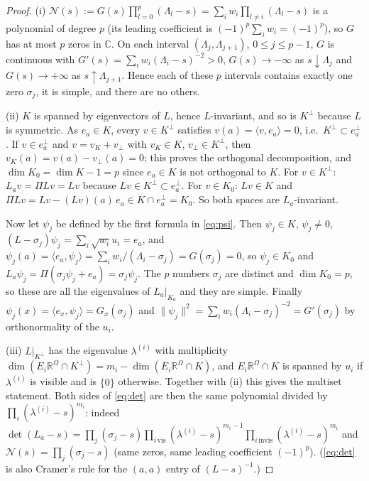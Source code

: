 \documentclass[11pt,a4paper]{article}
\newcommand{\R}{\mathbb R}
\newcommand{\ip}[2]{\langle #1,#2\rangle}
\theoremstyle{plain}
\theoremstyle{definition}
\numberwithin{equation}{section}
\begin{document}
\begin{proof}
(i) $\mathcal N(s):=G(s)\prod_{l=0}^p(\Lambda_l-s)=\sum_{i}w_i\prod_{l\ne i}(\Lambda_l-s)$ is a polynomial of degree $p$ (its leading coefficient is $(-1)^p\sum_iw_i=(-1)^p$), so $G$ has at most $p$ zeros in $\mathbb C$. On each interval $(\Lambda_j,\Lambda_{j+1})$, $0\le j\le p-1$, $G$ is continuous with $G'(s)=\sum_iw_i(\Lambda_i-s)^{-2}>0$, $G(s)\to-\infty$ as $s\downarrow\Lambda_j$ and $G(s)\to+\infty$ as $s\uparrow\Lambda_{j+1}$. Hence each of these $p$ intervals contains exactly one zero $\sigma_j$, it is simple, and there are no others.

(ii) $K$ is spanned by eigenvectors of $L$, hence $L$-invariant, and so is $K^\perp$ because $L$ is symmetric. As $e_a\in K$, every $v\in K^\perp$ satisfies $v(a)=\ip v{e_a}=0$, i.e.\ $K^\perp\subset e_a^\perp$. If $v\in e_a^\perp$ and $v=v_K+v_\perp$ with $v_K\in K$, $v_\perp\in K^\perp$, then $v_K(a)=v(a)-v_\perp(a)=0$; this proves the orthogonal decomposition, and $\dim K_0=\dim K-1=p$ since $e_a\in K$ is not orthogonal to $K$. For $v\in K^\perp$: $L_av=\Pi Lv=Lv$ because $Lv\in K^\perp\subset e_a^\perp$. For $v\in K_0$: $Lv\in K$ and $\Pi Lv=Lv-(Lv)(a)\,e_a\in K\cap e_a^\perp=K_0$. So both spaces are $L_a$-invariant.

Now let $\psi_j$ be defined by the first formula in \eqref{eq:psi}. Then $\psi_j\in K$, $\psi_j\ne0$, $(L-\sigma_j)\psi_j=\sum_i\sqrt{w_i}u_i=e_a$, and $\psi_j(a)=\ip{e_a}{\psi_j}=\sum_iw_i/(\Lambda_i-\sigma_j)=G(\sigma_j)=0$, so $\psi_j\in K_0$ and $L_a\psi_j=\Pi(\sigma_j\psi_j+e_a)=\sigma_j\psi_j$. The $p$ numbers $\sigma_j$ are distinct and $\dim K_0=p$, so these are all the eigenvalues of $L_a|_{K_0}$ and they are simple. Finally $\psi_j(x)=\ip{e_x}{\psi_j}=G_x(\sigma_j)$ and $\|\psi_j\|^2=\sum_iw_i(\Lambda_i-\sigma_j)^{-2}=G'(\sigma_j)$ by orthonormality of the $u_i$.

(iii) $L|_{K^\perp}$ has the eigenvalue $\lambda^{(i)}$ with multiplicity $\dim(E_i\R^\Omega\cap K^\perp)=m_i-\dim(E_i\R^\Omega\cap K)$, and $E_i\R^\Omega\cap K$ is spanned by $u_i$ if $\lambda^{(i)}$ is visible and is $\{0\}$ otherwise. Together with (ii) this gives the multiset statement. Both sides of \eqref{eq:det} are then the same polynomial divided by $\prod_i(\lambda^{(i)}-s)^{m_i}$: indeed $\det(L_a-s)=\prod_j(\sigma_j-s)\prod_{i\,\mathrm{vis}}(\lambda^{(i)}-s)^{m_i-1}\prod_{i\,\mathrm{invis}}(\lambda^{(i)}-s)^{m_i}$ and $\mathcal N(s)=\prod_j(\sigma_j-s)$ (same zeros, same leading coefficient $(-1)^p$).
(\eqref{eq:det} is also Cramer's rule for the $(a,a)$ entry of $(L-s)^{-1}$.)
\end{proof}
\end{document}
